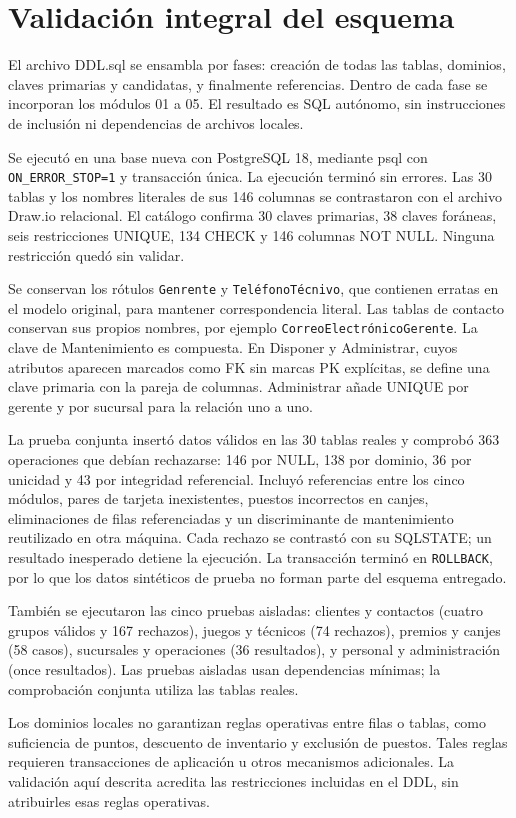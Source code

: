 \section{Validación integral del esquema}
El archivo DDL.sql se ensambla por fases: creación de todas las tablas,
dominios, claves primarias y candidatas, y finalmente referencias. Dentro de
cada fase se incorporan los módulos 01 a 05. El resultado es SQL autónomo,
sin instrucciones de inclusión ni dependencias de archivos locales.

Se ejecutó en una base nueva con PostgreSQL 18, mediante psql con
\texttt{ON\_ERROR\_STOP=1} y transacción única. La ejecución terminó sin errores.
Las 30 tablas y los nombres literales de sus 146 columnas se contrastaron
con el archivo Draw.io relacional. El catálogo confirma 30 claves primarias,
38 claves foráneas, seis restricciones UNIQUE, 134 CHECK y 146 columnas
NOT NULL. Ninguna restricción quedó sin validar.

Se conservan los rótulos \texttt{Genrente} y \texttt{TeléfonoTécnivo}, que
contienen erratas en el modelo original, para mantener correspondencia literal.
Las tablas de contacto conservan sus propios nombres, por ejemplo
\texttt{CorreoElectrónicoGerente}. La clave de Mantenimiento es compuesta.
En Disponer y Administrar, cuyos atributos aparecen marcados como FK sin
marcas PK explícitas, se define una clave primaria con la pareja de columnas.
Administrar añade UNIQUE por gerente y por sucursal para la relación uno a uno.

La prueba conjunta insertó datos válidos en las 30 tablas reales y comprobó
363 operaciones que debían rechazarse: 146 por NULL, 138 por dominio,
36 por unicidad y 43 por integridad referencial. Incluyó referencias entre
los cinco módulos, pares de tarjeta inexistentes, puestos incorrectos en canjes,
eliminaciones de filas referenciadas y un discriminante de mantenimiento
reutilizado en otra máquina. Cada rechazo se contrastó con su SQLSTATE;
un resultado inesperado detiene la ejecución. La transacción terminó en
\texttt{ROLLBACK}, por lo que los datos sintéticos de prueba no forman
parte del esquema entregado.

También se ejecutaron las cinco pruebas aisladas: clientes y contactos
(cuatro grupos válidos y 167 rechazos), juegos y técnicos (74 rechazos),
premios y canjes (58 casos), sucursales y operaciones (36 resultados),
y personal y administración (once resultados). Las pruebas aisladas usan
dependencias mínimas; la comprobación conjunta utiliza las tablas reales.

Los dominios locales no garantizan reglas operativas entre filas o tablas,
como suficiencia de puntos, descuento de inventario y exclusión de puestos.
Tales reglas requieren transacciones de aplicación u otros mecanismos
adicionales. La validación aquí descrita acredita las restricciones incluidas
en el DDL, sin atribuirles esas reglas operativas.
